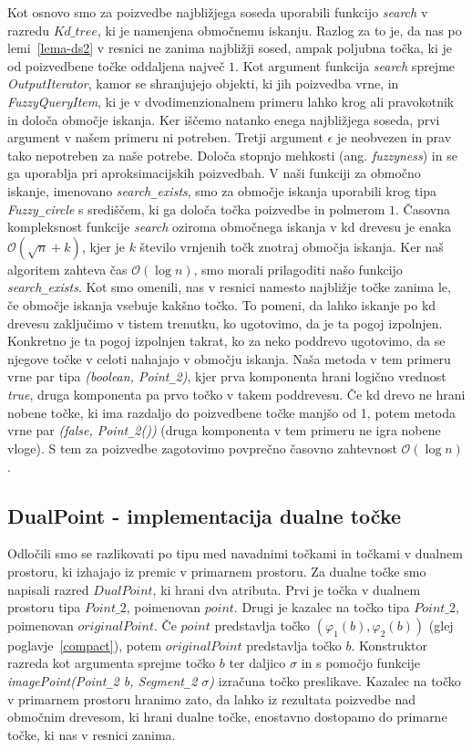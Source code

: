 \documentclass[a4paper, 12pt]{book}
\newcommand{\OO}{\ensuremath{\mathcal{O}}} %
\newcommand{\U}{\texttt{\_}}
\begin{document}
Kot osnovo smo za poizvedbe najbližjega soseda uporabili funkcijo \textit{search} v razredu $Kd{\_}tree$, ki je namenjena območnemu iskanju. Razlog za to je, da nas po lemi~\ref{lema-ds2} v resnici ne zanima najbližji sosed, ampak poljubna točka, ki je od poizvedbene točke oddaljena največ $1$. Kot argument funkcija \textit{search} sprejme \textit{OutputIterator}, kamor se shranjujejo objekti, ki jih poizvedba vrne, in \textit{FuzzyQueryItem}, ki je v dvodimenzionalnem primeru lahko krog ali pravokotnik in določa območje iskanja. Ker iščemo natanko enega najbližjega soseda, prvi argument v našem primeru ni potreben. Tretji argument $\epsilon$ je neobvezen in prav tako nepotreben za naše potrebe. Določa stopnjo mehkosti (ang. \textit{fuzzyness}) in se ga uporablja pri aproksimacijskih poizvedbah. V naši funkciji za območno iskanje, imenovano \textit{search\U exists}, smo za območje iskanja uporabili krog tipa \textit{Fuzzy\U circle} s središčem, ki ga določa točka poizvedbe in polmerom $1$. Časovna kompleksnost funkcije \textit{search} oziroma območnega iskanja v kd drevesu je enaka $\OO(\sqrt{n} + k)$, kjer je $k$ število vrnjenih točk znotraj območja iskanja. Ker naš algoritem zahteva čas $\OO(\log n)$, smo morali prilagoditi našo funkcijo \textit{search\U exists}. Kot smo omenili, nas v resnici namesto najbližje točke zanima le, če območje iskanja vsebuje kakšno točko. To pomeni, da lahko iskanje po kd drevesu zaključimo v tistem trenutku, ko ugotovimo, da je ta pogoj izpolnjen. Konkretno je ta pogoj izpolnjen takrat, ko za neko poddrevo ugotovimo, da se njegove točke v celoti nahajajo v območju iskanja. Naša metoda v tem primeru vrne par tipa \textit{(boolean, Point\U 2)}, kjer prva komponenta hrani logično vrednost \textit{true}, druga komponenta pa prvo točko v takem poddrevesu. Če kd drevo ne hrani nobene točke, ki ima razdaljo do poizvedbene točke manjšo od 1, potem metoda vrne par \textit{(false, Point\U 2())} (druga komponenta v tem primeru ne igra nobene vloge). S tem za poizvedbe zagotovimo povprečno časovno zahtevnost $\OO(\log n)$.

\subsection{DualPoint - implementacija dualne točke}

Odločili smo se razlikovati po tipu med navadnimi točkami in točkami v dualnem prostoru, ki izhajajo iz premic v primarnem prostoru. Za dualne točke smo napisali razred $DualPoint$, ki hrani dva atributa. Prvi je točka v dualnem prostoru tipa $Point\texttt{\_}2$, poimenovan $point$. Drugi je kazalec na točko tipa $Point\texttt{\_}2$, poimenovan $originalPoint$. Če $point$ predstavlja točko $(\varphi_1(b), \varphi_2(b))$ (glej poglavje~\ref{compact}), potem $originalPoint$ predstavlja točko $b$. Konstruktor razreda kot argumenta sprejme točko $b$ ter daljico $\sigma$ in s pomočjo funkcije \textit{imagePoint(Point\U 2 b, Segment\U 2 $\sigma$)} izračuna točko preslikave. Kazalec na točko v primarnem prostoru hranimo zato, da lahko iz rezultata poizvedbe nad območnim drevesom, ki hrani dualne točke, enostavno dostopamo do primarne točke, ki nas v resnici zanima.
\end{document}
